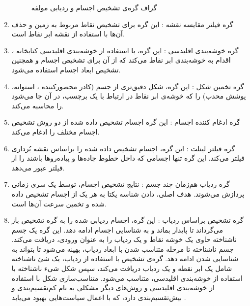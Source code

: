 \begin{enumerate}
\begin{figure}[h!]
    \caption{گراف گره‌‌ی تشخیص اجسام و ردیابی مولفه  \cite{Autoware:Documentation}}
    \label{fig:Autoware_Perception_Detection_Node_Graph}
    \end{figure}
    \item گره فیلتر مقایسه نقشه : این گره برای تشخیص نقاط مربوط به زمین و حذف آن‌ها با استفاده از نقشه ابر نقاط است.
    \item گره خوشه‌بندی اقلیدسی : این گره، با استفاده از خوشه‌بندی اقلیدسی کتابخانه ، اقدام به خوشه‌بندی ابر نقاط می‌کند که از آن برای تشخیص اجسام و همچنین تشخیص ابعاد اجسام استفاده می‌شود.
    \item گره تخمین شکل : این گره، شکل دقیق‌تری از جسم (کادر محصورکننده \cite{Zhang-2017-26536}، استوانه، پوشش محدب) را که خوشه‌ی ابر نقاط در ارتباط با یک برچسب، در آن جا می‌شود را محاسبه می‌کند.
    \item گره ادغام کننده اجسام : این گره اجسام تشخیص داده‌ شده از دو روش تشخیص اجسام مختلف را ادغام می‌کند.
    \item گره فیلتر لینلت : این گره، اجسام تشخیص داده شده را براساس نقشه بُرداری فیلتر می‌کند. این گره تنها اجسامی که داخل خطوط جاده‌ها و پیاده‌رو‌ها باشند را از فیلتر عبور می‌دهد.
    \item گره ردیاب هم‌زمان چند جسم : نتایج تشخیص اجسام، توسط یک سری زمانی پردازش می‌شوند. هدف اصلی، دادن شناسه یکتا به هر یک از اجسام تشخیص داده شده و تخمین سرعت ‌آن‌ها است.
    \item گره تشخیص براساس ردیاب : این گره، اجسام ردیابی شده را به گره تشخیص باز می‌گرداند تا پایدار بماند و به شناسایی اجسام ادامه دهد. این گره یک جسم ناشناخته حاوی یک خوشه نقاط و یک ردیاب را به عنوان ورودی، دریافت می‌کند. جسم ناشناخته تا مرحله متناسب شدن با ابعاد ردیاب، بهینه ‌می‌شود تا بتواند به شناسایی شدن ادامه دهد. 
    گره‌ی تشخیص با استفاده از ردیاب، یک شئ ناشناخته شامل یک ابر نقطه و یک ردیاب دریافت می‌کند، سپس شکل شیء ناشناخته با استفاده از خوشه‌بندی اقلیدسی، متناسب می‌شود. متناسب‌سازی شکل با استفاده از خوشه‌بندی اقلیدسی و روش‌های دیگر مشکلی به نام کم‌تقسیم‌بندی و بیش‌تقسیم‌بندی دارد، که با اعمال سیاست‌هایی بهبود می‌یابد \cite{Autoware_Universe:Documentation}.
\end{enumerate}

